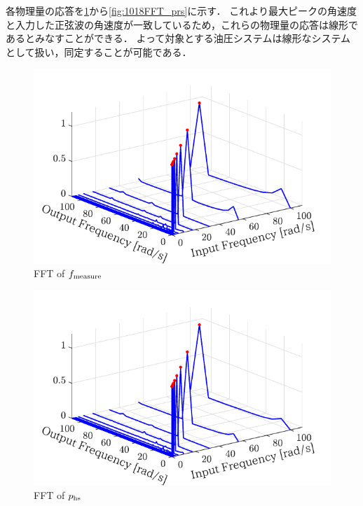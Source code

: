各物理量の応答を\figname\ref{fig:1018FFT_fmeasure}から\figname\ref{fig:1018FFT_prs}に示す．
これより最大ピークの角速度と入力した正弦波の角速度が一致しているため，これらの物理量の応答は線形であるとみなすことができる．
よって対象とする油圧システムは線形なシステムとして扱い，同定することが可能である．
\begin{figure}[t]
    \centering
        \includegraphics[keepaspectratio, scale=1.0]{contents/SystemIdentification/figure/1018FFT_fmeasure.pdf}
        \caption{FFT of $f_\mathrm{measure}$}
        \label{fig:1018FFT_fmeasure}
\end{figure}
\begin{figure}[t]
    \centering
        \includegraphics[keepaspectratio, scale=1.0]{contents/SystemIdentification/figure/1018FFT_phs.pdf}
        \caption{FFT of $p_\mathrm{hs}$}
        \label{fig:1018FFT_phs}
\end{figure}
